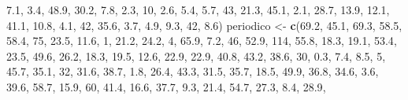 \documentclass[]{book}
\newenvironment{Shaded}{\begin{snugshade}}{\end{snugshade}}
\newcommand{\KeywordTok}[1]{\textcolor[rgb]{0.13,0.29,0.53}{\textbf{#1}}}
\newcommand{\DecValTok}[1]{\textcolor[rgb]{0.00,0.00,0.81}{#1}}
\newcommand{\FloatTok}[1]{\textcolor[rgb]{0.00,0.00,0.81}{#1}}
\newcommand{\StringTok}[1]{\textcolor[rgb]{0.31,0.60,0.02}{#1}}
\newcommand{\NormalTok}[1]{#1}
\begin{document}
\begin{Shaded}
\begin{Highlighting}[]
    \FloatTok{7.1}\NormalTok{, }\FloatTok{3.4}\NormalTok{, }\FloatTok{48.9}\NormalTok{, }\FloatTok{30.2}\NormalTok{, }\FloatTok{7.8}\NormalTok{, }\FloatTok{2.3}\NormalTok{, }\DecValTok{10}\NormalTok{, }\FloatTok{2.6}\NormalTok{, }\FloatTok{5.4}\NormalTok{, }\FloatTok{5.7}\NormalTok{, }\DecValTok{43}\NormalTok{, }\FloatTok{21.3}\NormalTok{, }\FloatTok{45.1}\NormalTok{, }\FloatTok{2.1}\NormalTok{, }
    \FloatTok{28.7}\NormalTok{, }\FloatTok{13.9}\NormalTok{, }\FloatTok{12.1}\NormalTok{, }\FloatTok{41.1}\NormalTok{, }\FloatTok{10.8}\NormalTok{, }\FloatTok{4.1}\NormalTok{, }\DecValTok{42}\NormalTok{, }\FloatTok{35.6}\NormalTok{, }\FloatTok{3.7}\NormalTok{, }\FloatTok{4.9}\NormalTok{, }\FloatTok{9.3}\NormalTok{, }\DecValTok{42}\NormalTok{, }\FloatTok{8.6}\NormalTok{)}
\NormalTok{periodico <-}\StringTok{ }\KeywordTok{c}\NormalTok{(}\FloatTok{69.2}\NormalTok{, }\FloatTok{45.1}\NormalTok{, }\FloatTok{69.3}\NormalTok{, }\FloatTok{58.5}\NormalTok{, }\FloatTok{58.4}\NormalTok{, }\DecValTok{75}\NormalTok{, }\FloatTok{23.5}\NormalTok{, }\FloatTok{11.6}\NormalTok{, }\DecValTok{1}\NormalTok{, }\FloatTok{21.2}\NormalTok{, }\FloatTok{24.2}\NormalTok{, }
    \DecValTok{4}\NormalTok{, }\FloatTok{65.9}\NormalTok{, }\FloatTok{7.2}\NormalTok{, }\DecValTok{46}\NormalTok{, }\FloatTok{52.9}\NormalTok{, }\DecValTok{114}\NormalTok{, }\FloatTok{55.8}\NormalTok{, }\FloatTok{18.3}\NormalTok{, }\FloatTok{19.1}\NormalTok{, }\FloatTok{53.4}\NormalTok{, }\FloatTok{23.5}\NormalTok{, }\FloatTok{49.6}\NormalTok{, }\FloatTok{26.2}\NormalTok{, }\FloatTok{18.3}\NormalTok{, }
    \FloatTok{19.5}\NormalTok{, }\FloatTok{12.6}\NormalTok{, }\FloatTok{22.9}\NormalTok{, }\FloatTok{22.9}\NormalTok{, }\FloatTok{40.8}\NormalTok{, }\FloatTok{43.2}\NormalTok{, }\FloatTok{38.6}\NormalTok{, }\DecValTok{30}\NormalTok{, }\FloatTok{0.3}\NormalTok{, }\FloatTok{7.4}\NormalTok{, }\FloatTok{8.5}\NormalTok{, }\DecValTok{5}\NormalTok{, }\FloatTok{45.7}\NormalTok{, }\FloatTok{35.1}\NormalTok{, }
    \DecValTok{32}\NormalTok{, }\FloatTok{31.6}\NormalTok{, }\FloatTok{38.7}\NormalTok{, }\FloatTok{1.8}\NormalTok{, }\FloatTok{26.4}\NormalTok{, }\FloatTok{43.3}\NormalTok{, }\FloatTok{31.5}\NormalTok{, }\FloatTok{35.7}\NormalTok{, }\FloatTok{18.5}\NormalTok{, }\FloatTok{49.9}\NormalTok{, }\FloatTok{36.8}\NormalTok{, }\FloatTok{34.6}\NormalTok{, }\FloatTok{3.6}\NormalTok{, }
    \FloatTok{39.6}\NormalTok{, }\FloatTok{58.7}\NormalTok{, }\FloatTok{15.9}\NormalTok{, }\DecValTok{60}\NormalTok{, }\FloatTok{41.4}\NormalTok{, }\FloatTok{16.6}\NormalTok{, }\FloatTok{37.7}\NormalTok{, }\FloatTok{9.3}\NormalTok{, }\FloatTok{21.4}\NormalTok{, }\FloatTok{54.7}\NormalTok{, }\FloatTok{27.3}\NormalTok{, }\FloatTok{8.4}\NormalTok{, }\FloatTok{28.9}\NormalTok{, }

\end{Highlighting}
\end{Shaded}
\end{document}
